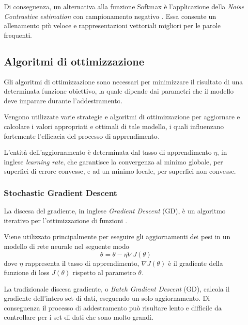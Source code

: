Di conseguenza, un alternativa alla funzione Softmax è l'applicazione della \emph{Noise Contrastive estimation} con campionamento negativo \cite{liu2016classification, viswesvaran2000measurement}. Essa consente un allenamento più veloce e rappresentazioni vettoriali migliori per le parole frequenti.

\subsection{Algoritmi di ottimizzazione}
\label{subsec:optimizer}

Gli algoritmi di ottimizzazione sono necessari per minimizzare il risultato di una determinata funzione obiettivo, la quale dipende dai parametri che il modello deve imparare durante l'addestramento. 

Vengono utilizzate varie strategie e algoritmi di ottimizzazione per aggiornare e calcolare i valori appropriati e ottimali di tale modello, i quali influenzano fortemente l'efficacia del processo di apprendimento.

L'entità dell'aggiornamento è determinata dal tasso di apprendimento $\eta$, in inglese \emph{learning rate}, che garantisce la convergenza al minimo globale, per superfici di errore convesse, e ad un minimo locale, per superfici non convesse. 

\subsubsection{Stochastic Gradient Descent}
\label{subsubsec:SGD}

La discesa del gradiente, in inglese \emph{Gradient Descent} (GD), è un algoritmo iterativo per l'ottimizzazione di funzioni \cite{ruder2016overview}.

Viene utilizzato principalmente per eseguire gli aggiornamenti dei pesi in un modello di rete neurale nel seguente modo
\begin{equation}
\theta = \theta - \eta \nabla J(\theta)
\end{equation}
dove $\eta$ rappresenta il tasso di apprendimento, $\nabla J(\theta)$ è il gradiente della funzione di loss $J(\theta)$ rispetto al parametro $\theta$. 

La tradizionale discesa gradiente, o \emph{Batch Gradient Descent} (GD), calcola il gradiente dell'intero set di dati, eseguendo un solo aggiornamento. Di conseguenza il processo di addestramento può risultare lento e difficile da controllare per i set di dati che sono molto grandi. 

